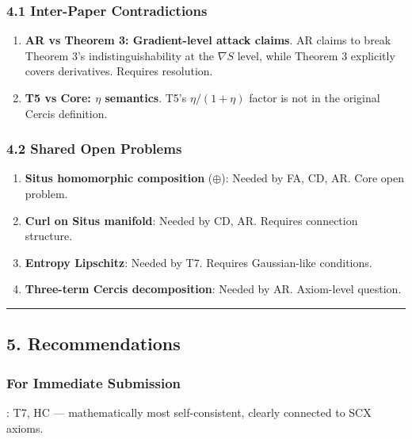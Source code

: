 \documentclass[
  12pt,
]{article}
\providecommand{\tightlist}{%
  \setlength{\itemsep}{0pt}\setlength{\parskip}{0pt}}
\begin{document}
\subsubsection{4.1 Inter-Paper Contradictions}\label{inter-paper-contradictions}

\begin{enumerate}
\def\labelenumi{\arabic{enumi}.}
\tightlist
\item \textbf{AR vs Theorem 3: Gradient-level attack claims}. AR claims to break Theorem 3's indistinguishability at the $\nabla S$ level, while Theorem 3 explicitly covers derivatives. Requires resolution.
\item \textbf{T5 vs Core: $\eta$ semantics}. T5's $\eta/(1+\eta)$ factor is not in the original Cercis definition.
\end{enumerate}

\subsubsection{4.2 Shared Open Problems}\label{shared-open-problems}

\begin{enumerate}
\def\labelenumi{\arabic{enumi}.}
\tightlist
\item \textbf{Situs homomorphic composition} ($\oplus$): Needed by FA, CD, AR. Core open problem.
\item \textbf{Curl on Situs manifold}: Needed by CD, AR. Requires connection structure.
\item \textbf{Entropy Lipschitz}: Needed by T7. Requires Gaussian-like conditions.
\item \textbf{Three-term Cercis decomposition}: Needed by AR. Axiom-level question.
\end{enumerate}

\begin{center}\rule{0.5\linewidth}{0.5pt}\end{center}

\subsection{5. Recommendations}\label{recommendations}

\subsubsection{For Immediate Submission}: T7, HC --- mathematically most self-consistent, clearly connected to SCX axioms.
\end{document}
